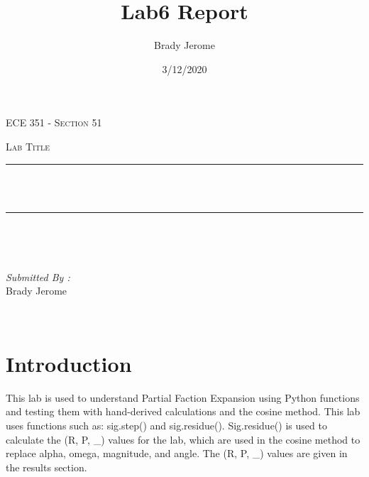 \documentclass[12pt]{report}
\title{Lab6 Report}
\author{Brady Jerome}
\date{3/12/2020}
\makeatletter
\let\thetitle\@title
\makeatother
\begin{document}

\begin{titlepage}
	\centering
    \vspace*{0.5 cm}
\begin{center}    \textsc{\Large   ECE 351 - Section 51 }\\[2.0 cm]	\end{center}%
	\textsc{\Large Lab Title  }\\[0.5 cm]				%
	\rule{\linewidth}{0.2 mm} \\[0.4 cm]
	{ \huge \bfseries \thetitle}\\
	\rule{\linewidth}{0.2 mm} \\[1.5 cm]
	
	\begin{minipage}{0.4\textwidth}
		\begin{flushleft} \large
			\end{flushleft}
			\end{minipage}~
			\begin{minipage}{0.4\textwidth}
            
			\begin{flushright} \large
			\emph{Submitted By :} \\
			Brady Jerome  
		\end{flushright}
           
	\end{minipage}\\[2 cm]
	
    
    
    
    
	
\end{titlepage}


\tableofcontents
\pagebreak

\renewcommand{\thesection}{\arabic{section}}
\section{Introduction}

This lab is used to understand Partial Faction Expansion using Python functions and testing them with hand-derived calculations and the cosine method. This lab uses functions such as: sig.step() and sig.residue(). Sig.residue() is used to calculate the (R, P, _) values for the lab, which are used in the cosine method to replace alpha, omega, magnitude, and angle. The (R, P, _) values are given in the results section.
\end{document}

